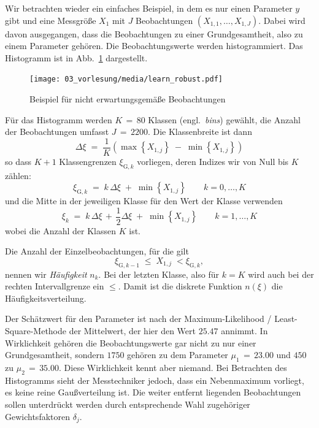 Wir betrachten wieder ein einfaches Beispiel, in dem es nur einen Parameter $y$ gibt und eine 
Messgröße $X_1$ mit $J$ Beobachtungen $(X_{1,1},\dots,X_{1,J})$.
Dabei wird davon ausgegangen, dass die Beobachtungen zu einer Grundgesamtheit, also zu einem Parameter gehören.
Die Beobachtungswerte werden histogrammiert. Das Histogramm ist in Abb.~\ref{biasExampleKap3} dargestellt.
\begin{figure}
\begin{center}
\texttt{[image: 03\_vorlesung/media/learn\_robust.pdf]}
\caption{Beispiel für nicht erwartungsgemäße Beobachtungen}
\label{biasExampleKap3}
\end{center}
\end{figure}
Für das Histogramm werden $K \, = \, 80$ Klassen (engl.\ \textsl{bins}) gewählt, die Anzahl der Beobachtungen umfasst $J \, = \, 2200$.
Die Klassenbreite ist dann
\begin{equation}
\Delta \xi \; = \; \frac{1}{K} \left( \max \left\{X_{1,j}\right\} \; - \; \min \left\{X_{1,j}\right\} \right)
\end{equation}
so dass $K+1$ Klassengrenzen $\xi_{\mathrm{G}, k}$ vorliegen,
deren Indizes wir von Null bis $K$ zählen:
\begin{equation}
 \xi_{\mathrm{G}, k} \; = \; k \, \Delta \xi \; + \; \min \left\{X_{1,j}\right\}
\qquad k = 0, \dots, K
\label{limkthbin}
\end{equation}
und die Mitte in der jeweiligen Klasse für den Wert der Klasse verwenden
\begin{equation}
 \xi_k \; = \; k \, \Delta \xi  \, + \, \frac{1}{2} \Delta \xi  \; + \; \min \left\{X_{1,j}\right\}
\qquad k = 1, \dots, K
\label{kthbin}
\end{equation}
wobei die Anzahl der Klassen $K$ ist.

Die Anzahl der Einzelbeobachtungen, für die gilt
\begin{equation}
\xi_{\mathrm{G}, k-1} \; \leq \; X_{1,j} \; <  \xi_{\mathrm{G}, k},
\end{equation}
nennen wir \textsl{Häufigkeit} $n_k$. Bei der letzten Klasse, also für
$k = K$ wird auch bei der rechten Intervallgrenze ein $\leq$.
Damit ist die diskrete Funktion $n(\xi)$ die Häufigkeitsverteilung.

Der Schätzwert für den Parameter ist nach der Maximum-Likelihood / Least-Square-Methode der
Mittelwert, der hier den Wert $25.47$ annimmt. In Wirklichkeit gehören die Beobachtungswerte gar nicht zu
nur einer Grundgesamtheit, sondern $1750$ gehören zu dem Parameter $\mu_1 \, = \, 23.00$ und $450$ zu $\mu_2 \, = \, 35.00$.
Diese Wirklichkeit kennt aber niemand. Bei Betrachten des Histogramms sieht der Messtechniker jedoch, dass ein
Nebenmaximum vorliegt, es keine reine Gaußverteilung ist. Die weiter entfernt liegenden Beobachtungen sollen unterdrückt werden
durch entsprechende Wahl zugehöriger Gewichtsfaktoren $\delta_j$.

